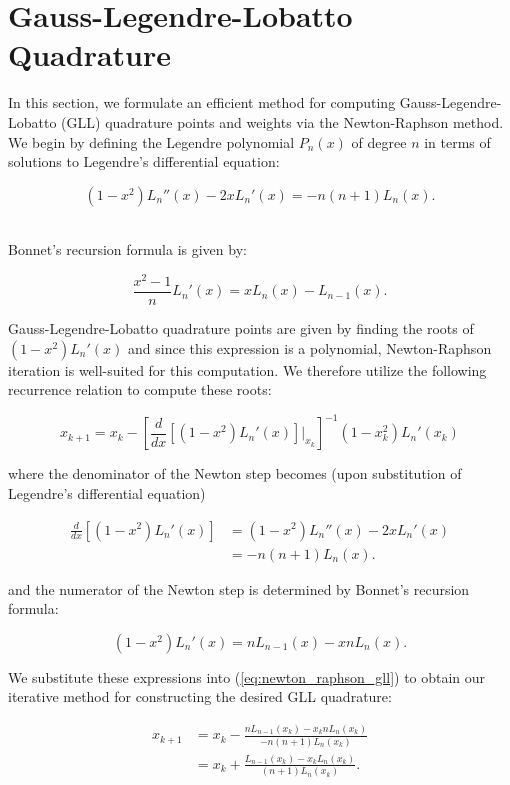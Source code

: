 \section{Gauss-Legendre-Lobatto Quadrature}\label{appendix:gll}

In this section, we formulate an efficient method for computing Gauss-Legendre-Lobatto (GLL) quadrature points and 
weights via the Newton-Raphson method. We begin by defining the Legendre polynomial $P_n(x)$ of degree $n$ in terms of
solutions to Legendre's differential \linebreak
equation:\cite{NEEDED}

$$
(1 - x^2) L_n''(x) - 2 x L_n'(x) = -n (n + 1) L_n(x).
$$

\ \\
\noindent Bonnet's recursion formula is given by:\cite{NEEDED}

$$
\frac{x^2 - 1}{n} L_n'(x) = x L_n(x) - L_{n - 1}(x).
$$

Gauss-Legendre-Lobatto quadrature points are given by finding the roots of\linebreak
$(1 - x^2) L_n'(x)$ and since this expression is a polynomial, Newton-Raphson iteration is well-suited for this 
computation.\cite{Quarteroni2014} We therefore utilize the following recurrence relation to compute these roots:

\begin{equation}\label{eq:newton_raphson_gll}
x_{k+1} = x_k - \left[ \frac{d}{dx} \left[ (1 - x^2) L_n'(x) \right]\bigg\vert_{x_k} \right]^{-1} (1 - x_k^2)L_n'(x_k)
\end{equation}

where the denominator of the Newton step becomes (upon substitution of Legendre's differential equation)

\begin{align*}
\frac{d}{dx} \left[ (1 - x^2) L_n'(x) \right] &= (1 - x^2) L_n''(x) - 2 x L_n'(x) \\
                                              &= -n(n + 1) L_n(x).
\end{align*}

and the numerator of the Newton step is determined by Bonnet's recursion formula:

$$
(1 - x^2) L_n'(x) = n L_{n - 1}(x) - x n L_n(x).
$$

We substitute these expressions into (\ref{eq:newton_raphson_gll}) to obtain our iterative method for constructing the
desired GLL quadrature:

\begin{align*}
x_{k+1} &= x_k - \frac{n L_{n - 1}(x_k) - x_k n L_n(x_k)}{-n(n + 1) L_n(x_k)} \\
        &= x_k + \frac{L_{n - 1}(x_k) - x_k L_n(x_k)}{(n + 1) L_n(x_k)}.
\end{align*}